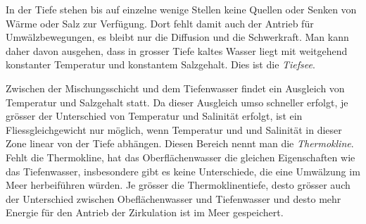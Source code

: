 In der Tiefe stehen bis auf einzelne wenige Stellen keine Quellen oder
Senken von Wärme oder Salz zur Verfügung.
Dort fehlt damit auch der Antrieb für Umwälzbewegungen, es bleibt
nur die Diffusion und die Schwerkraft.
Man kann daher davon ausgehen, dass in grosser Tiefe kaltes Wasser 
liegt mit weitgehend konstanter Temperatur und konstantem Salzgehalt.
Dies ist die {\em Tiefsee}.
%

Zwischen der Mischungsschicht und dem Tiefenwasser findet ein Ausgleich
von Temperatur und Salzgehalt statt.
Da dieser Ausgleich umso schneller erfolgt, je grösser der Unterschied
von Temperatur und Salinität erfolgt, ist ein Fliessgleichgewicht nur
möglich, wenn Temperatur und und Salinität in dieser Zone linear
von der Tiefe abhängen.
Diesen Bereich nennt man die {\em Thermokline}.
%
Fehlt die Thermokline, hat das Oberflächenwasser die gleichen Eigenschaften
wie das Tiefenwasser, insbesondere gibt es keine Unterschiede, die eine
Umwälzung im Meer herbeiführen würden.
Je grösser die Thermoklinentiefe, desto grösser auch der Unterschied
zwischen Obeflächenwasser und Tiefenwasser und desto mehr Energie für
den Antrieb der Zirkulation ist im Meer gespeichert.

